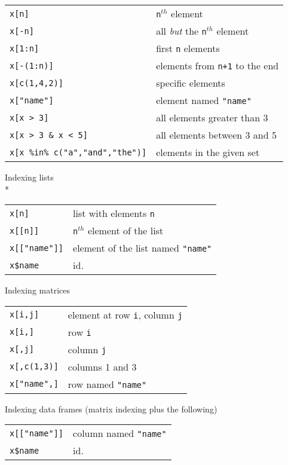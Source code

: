 \documentclass[10pt,landscape]{article}
\newcommand{\code}{\texttt}
\begin{document}
\begin{multicols*}{3}
\begin{tabular}{@{}l@{\ }l}
\code{x[n]} & \code{n}$^{th}$ element\\
\code{x[-n]} & all \emph{but} the \code{n}$^{th}$ element\\
\code{x[1:n]} & first \code{n} elements\\
\code{x[-(1:n)]} & elements from \code{n+1} to the end\\
\code{x[c(1,4,2)]} & specific elements\\
\code{x["name"]} & element named \code{"name"}\\
\code{x[x > 3]} & all elements greater than 3\\
\code{x[x > 3 \& x < 5]} & all elements between 3 and 5\\
\code{x[x \%in\% c("a","and","the")]} & elements in the given set\\
\end{tabular}

Indexing lists\\*
\samepage\begin{tabular}{@{}l@{\ }l}
\code{x[n]} & list with elements \code{n}\\
\code{x[[n]]} & \code{n}$^{th}$ element of the list\\
\code{x[["name"]]} & element of the list named \code{"name"}\\
\code{x\$name} & id.\\
\end{tabular}

Indexing matrices

\begin{tabular}{@{}l@{\ }l}
\code{x[i,j]} & element at row \code{i}, column \code{j}\\
\code{x[i,]} & row \code{i}\\
\code{x[,j]} & column \code{j}\\
\code{x[,c(1,3)]} & columns 1 and 3\\
\code{x["name",]} & row named \code{"name"}\\
\end{tabular}

Indexing data frames (matrix indexing plus the following)

\begin{tabular}{@{}l@{\ }l}
\code{x[["name"]]} & column named \code{"name"}\\
\code{x\$name} & id.\\
\end{tabular}


\end{multicols*}
\end{document}
